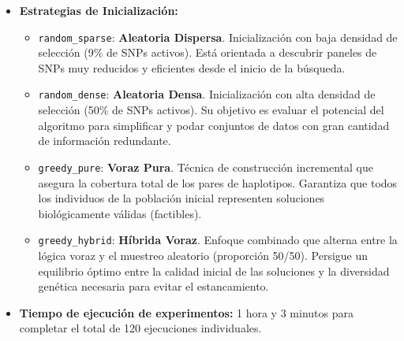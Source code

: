 \documentclass[a4paper,10pt]{article} %
\begin{document}
\begin{itemize}
\begin{itemize}
\begin{itemize}
        \end{itemize}
        \item \textbf{Ajustes específicos de los algoritmos:}
        \begin{itemize}
            \item \textbf{NSGA-II / SPEA2:} Basados en ordenamiento por dominancia y densidad de soluciones.
            \item \textbf{NSGA-III:} 8 particiones por objetivo para generar un conjunto de 165 direcciones de referencia.
            \item \textbf{MOEA/D (TCHE, PBI, WS):}
            \begin{itemize}
                \item \textbf{Tamaño del vecindario:} 15 subproblemas.
                \item \textbf{Probabilidad de selección en vecindad:} 90\%.
                \item \textbf{Valor de penalización PBI:} 5.0.
            \end{itemize}
        \end{itemize}
    \end{itemize}
    \item \textbf{Estrategias de Inicialización:}
    \begin{itemize}
        \item \texttt{random\_sparse}: \textbf{Aleatoria Dispersa}. Inicialización con baja densidad de selección (9\% de SNPs activos). Está orientada a descubrir paneles de SNPs muy reducidos y eficientes desde el inicio de la búsqueda.
        \item \texttt{random\_dense}: \textbf{Aleatoria Densa}. Inicialización con alta densidad de selección (50\% de SNPs activos). Su objetivo es evaluar el potencial del algoritmo para simplificar y podar conjuntos de datos con gran cantidad de información redundante.
        \item \texttt{greedy\_pure}: \textbf{Voraz Pura}. Técnica de construcción incremental que asegura la cobertura total de los pares de haplotipos. Garantiza que todos los individuos de la población inicial representen soluciones biológicamente válidas (factibles).
        \item \texttt{greedy\_hybrid}: \textbf{Híbrida Voraz}. Enfoque combinado que alterna entre la lógica voraz y el muestreo aleatorio (proporción 50/50). Persigue un equilibrio óptimo entre la calidad inicial de las soluciones y la diversidad genética necesaria para evitar el estancamiento.
    \end{itemize}
    \item \textbf{Tiempo de ejecución de experimentos:} 1 hora y 3 minutos para completar el total de 120 ejecuciones individuales.
\end{itemize}
\end{document}
